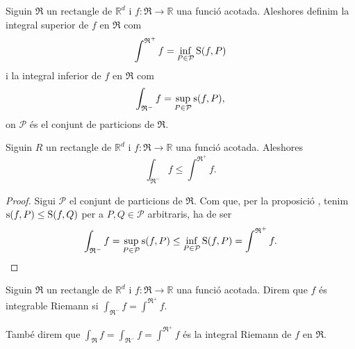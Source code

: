 \documentclass[../Apunts.tex]{subfiles}
\begin{document}
	\begin{definition}
		\label{def:Integral superior i inferior}
		Siguin \(\mathfrak{R}\) un rectangle de \(\mathbb{R}^{d}\) i \(f\colon\mathfrak{R}\to\mathbb{R}\) una funció acotada. Aleshores definim la integral superior de \(f\) en \(\mathfrak{R}\) com
		\[\int^{\mathfrak{R}^{+}}f=\inf_{P\in\mathcal{P}}\operatorname{S}(f,P)\]
		i la integral inferior de \(f\) en \(\mathfrak{R}\) com
		\[\int_{\mathfrak{R}^{-}}f=\sup_{P\in\mathcal{P}}\operatorname{s}(f,P),\]
		on \(\mathcal{P}\) és el conjunt de particions de \(\mathfrak{R}\).
	\end{definition}
	\begin{proposition}
		Siguin \(R\) un rectangle de \(\mathbb{R}^{d}\) i \(f\colon\mathfrak{R}\to\mathbb{R}\) una funció acotada. Aleshores
		\[\int_{\mathfrak{R}^{-}}f\leq\int^{\mathfrak{R}^{+}}f.\]
		\begin{proof}
			Sigui \(\mathcal{P}\) el conjunt de particions de \(\mathfrak{R}\). Com que, per la proposició , tenim \(\operatorname{s}(f,P)\leq\operatorname{S}(f,Q)\) per a \(P,Q\in\mathcal{P}\) arbitraris, ha de ser
			\[\int_{\mathfrak{R}^{-}}f=\sup_{P\in\mathcal{P}}\operatorname{s}(f,P)\leq\inf_{P\in\mathcal{P}}\operatorname{S}(f,P)=\int^{\mathfrak{R}^{+}}f.\qedhere\]
		\end{proof}
	\end{proposition}
	\begin{definition}
		\label{def:Integrable Riemann}
		Siguin \(\mathfrak{R}\) un rectangle de \(\mathbb{R}^{d}\) i \(f\colon\mathfrak{R}\to\mathbb{R}\) una funció acotada. Direm que \(f\) és integrable Riemann si \(\int_{\mathfrak{R}^{-}}f=\int^{\mathfrak{R}^{+}}f\).
		
		També direm que \(\int_\mathfrak{R}f=\int_{\mathfrak{R}^{-}}f=\int^{\mathfrak{R}^{+}}f\) és la integral Riemann de \(f\) en \(\mathfrak{R}\).
	\end{definition}
\end{document}
